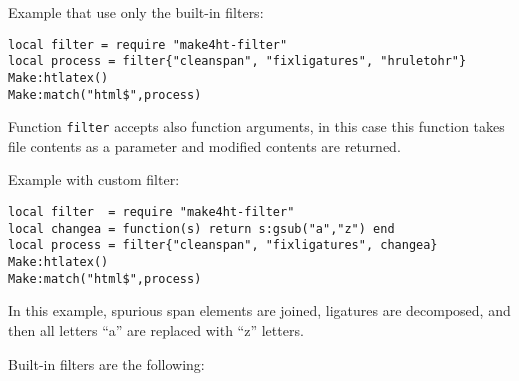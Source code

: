 Example that use only the built-in filters:

\begin{verbatim}
local filter = require "make4ht-filter"
local process = filter{"cleanspan", "fixligatures", "hruletohr"}
Make:htlatex()
Make:match("html$",process)
\end{verbatim}

Function \texttt{filter} accepts also function arguments, in this case
this function takes file contents as a parameter and modified contents
are returned.

Example with custom filter:

\begin{verbatim}
local filter  = require "make4ht-filter"
local changea = function(s) return s:gsub("a","z") end
local process = filter{"cleanspan", "fixligatures", changea}
Make:htlatex()
Make:match("html$",process)
\end{verbatim}

In this example, spurious span elements are joined, ligatures are
decomposed, and then all letters ``a'' are replaced with ``z'' letters.

Built-in filters are the following:

